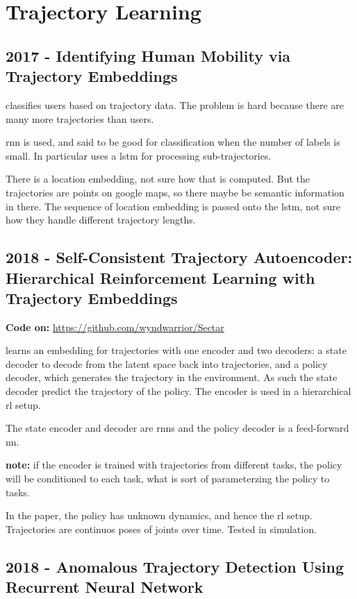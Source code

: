 \section{Trajectory Learning}\label{sec: traj learning}

\subsection*{2017 - Identifying Human Mobility via Trajectory Embeddings}
\cite{gao2017identifying} classifies users based on trajectory data. The problem is hard because there are many more trajectories than users.

\gls{rnn} is used, and said to be good for classification when the number of labels is small. In particular uses a \gls{lstm} for processing sub-trajectories.

There is a location embedding, not sure how that is computed. But the trajectories are points on google maps, so there maybe be semantic information in there.
%
The sequence of location embedding is passed onto the \gls{lstm}, not sure how they handle different trajectory lengths.


\subsection*{2018 - Self-Consistent Trajectory Autoencoder: Hierarchical Reinforcement Learning with Trajectory Embeddings}

\textbf{Code on:} \url{https://github.com/wyndwarrior/Sectar}

\cite{co2018self} learns an embedding for trajectories with one encoder and two decoders: a state decoder to decode from the latent space back into trajectories, and a policy decoder, which generates the trajectory in the environment. As such the state decoder predict the trajectory of the policy. The encoder is used in a hierarchical \gls{rl} setup.

The state encoder and decoder are \glspl{rnn} and the policy decoder is a feed-forward \gls{nn}.

\textbf{note:} if the encoder is trained with trajectories from different tasks, the policy will be conditioned to each task, what is sort of parameterzing the policy to tasks. 

In the paper, the policy has unknown dynamics, and hence the \gls{rl} setup. Trajectories are continuos poses of joints over time. Tested in simulation. 

\subsection*{2018 - Anomalous Trajectory Detection Using Recurrent Neural Network}

